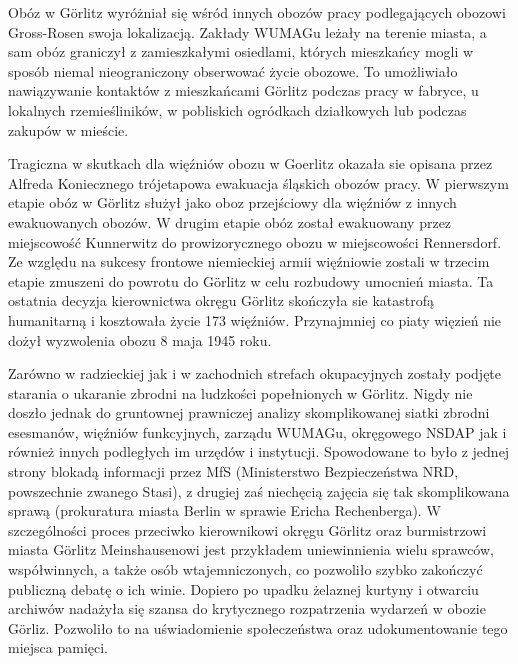 Obóz w Görlitz wyróżniał się wśród innych obozów pracy podlegających obozowi Gross-Rosen swoja lokalizacją. Zakłady WUMAGu leżały na terenie miasta, a sam obóz graniczył z zamieszkałymi osiedlami, których mieszkańcy mogli w sposób niemal nieograniczony obserwować życie obozowe. To umożliwiało nawiązywanie kontaktów z mieszkańcami Görlitz podczas pracy w fabryce, u lokalnych rzemieśliników, w pobliskich ogródkach działkowych lub podczas zakupów w mieście.

Tragiczna w skutkach dla więźniów obozu w Goerlitz okazała sie opisana przez Alfreda Koniecznego trójetapowa ewakuacja śląskich obozów pracy. W pierwszym etapie obóz w Görlitz służył jako oboz przejściowy dla więźniów z innych ewakuowanych obozów. W drugim etapie obóz został ewakuowany przez miejscowość Kunnerwitz do prowizorycznego obozu w miejscowości Rennersdorf. Ze względu na sukcesy frontowe niemieckiej armii więźniowie zostali w trzecim etapie zmuszeni do powrotu do Görlitz w celu rozbudowy umocnień miasta. Ta ostatnia decyzja kierownictwa okręgu Görlitz skończyła sie katastrofą humanitarną i kosztowała życie 173 więźniów. Przynajmniej co piaty więzień nie dożył wyzwolenia obozu 8 maja 1945 roku.

Zarówno w radzieckiej jak i w zachodnich strefach okupacyjnych zostały podjęte starania o ukaranie zbrodni na ludzkości popełnionych w Görlitz. Nigdy nie doszło jednak do gruntownej prawniczej analizy skomplikowanej siatki zbrodni esesmanów, więźniów funkcyjnych, zarządu WUMAGu, okręgowego NSDAP jak i również innych podległych im urzędów i instytucji. Spowodowane to było z jednej strony blokadą informacji przez MfS (Ministerstwo Bezpieczeństwa NRD, powszechnie zwanego Stasi), z drugiej zaś niechęcią zajęcia się tak skomplikowana sprawą (prokuratura miasta Berlin w sprawie Ericha Rechenberga). W szczególności proces przeciwko kierownikowi okręgu Görlitz oraz burmistrzowi miasta Görlitz Meinshausenowi jest przykładem uniewinnienia wielu sprawców, współwinnych, a także osób wtajemniczonych, co pozwoliło szybko zakończyć publiczną debatę o ich winie. Dopiero po upadku żelaznej kurtyny i otwarciu archiwów nadażyła się szansa do krytycznego rozpatrzenia wydarzeń w obozie Görliz. Pozwoliło to na uświadomienie społeczeństwa oraz udokumentowanie tego miejsca pamięci. 

